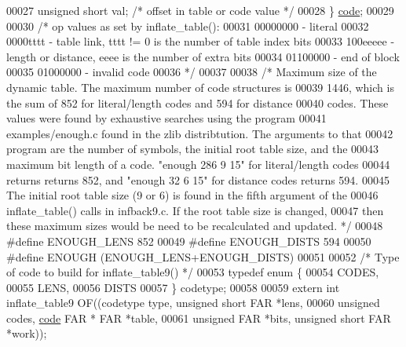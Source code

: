 \begin{DoxyCode}
00027     \textcolor{keywordtype}{unsigned} \textcolor{keywordtype}{short} val;         \textcolor{comment}{/* offset in table or code value */}
00028 \} \hyperlink{structcode}{code};
00029 
00030 \textcolor{comment}{/* op values as set by inflate\_table():}
00031 \textcolor{comment}{    00000000 - literal}
00032 \textcolor{comment}{    0000tttt - table link, tttt != 0 is the number of table index bits}
00033 \textcolor{comment}{    100eeeee - length or distance, eeee is the number of extra bits}
00034 \textcolor{comment}{    01100000 - end of block}
00035 \textcolor{comment}{    01000000 - invalid code}
00036 \textcolor{comment}{ */}
00037 
00038 \textcolor{comment}{/* Maximum size of the dynamic table.  The maximum number of code structures is}
00039 \textcolor{comment}{   1446, which is the sum of 852 for literal/length codes and 594 for distance}
00040 \textcolor{comment}{   codes.  These values were found by exhaustive searches using the program}
00041 \textcolor{comment}{   examples/enough.c found in the zlib distribtution.  The arguments to that}
00042 \textcolor{comment}{   program are the number of symbols, the initial root table size, and the}
00043 \textcolor{comment}{   maximum bit length of a code.  "enough 286 9 15" for literal/length codes}
00044 \textcolor{comment}{   returns returns 852, and "enough 32 6 15" for distance codes returns 594.}
00045 \textcolor{comment}{   The initial root table size (9 or 6) is found in the fifth argument of the}
00046 \textcolor{comment}{   inflate\_table() calls in infback9.c.  If the root table size is changed,}
00047 \textcolor{comment}{   then these maximum sizes would be need to be recalculated and updated. */}
00048 \textcolor{preprocessor}{#define ENOUGH\_LENS 852}
00049 \textcolor{preprocessor}{#define ENOUGH\_DISTS 594}
00050 \textcolor{preprocessor}{#define ENOUGH (ENOUGH\_LENS+ENOUGH\_DISTS)}
00051 
00052 \textcolor{comment}{/* Type of code to build for inflate\_table9() */}
00053 \textcolor{keyword}{typedef} \textcolor{keyword}{enum} \{
00054     CODES,
00055     LENS,
00056     DISTS
00057 \} codetype;
00058 
00059 \textcolor{keyword}{extern} \textcolor{keywordtype}{int} inflate\_table9 OF((codetype type, \textcolor{keywordtype}{unsigned} \textcolor{keywordtype}{short} FAR *lens,
00060                              \textcolor{keywordtype}{unsigned} codes, \hyperlink{structcode}{code} FAR * FAR *table,
00061                              \textcolor{keywordtype}{unsigned} FAR *bits, \textcolor{keywordtype}{unsigned} \textcolor{keywordtype}{short} FAR *work));
\end{DoxyCode}
